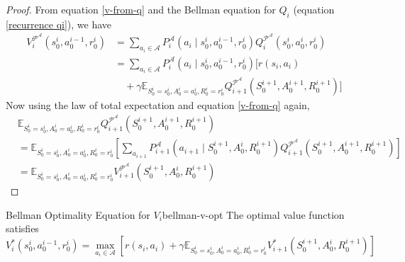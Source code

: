 \documentclass[a4paper, 11pt]{article}
\numberwithin{equation}{section}
\theoremstyle{plain}
\theoremstyle{definition}
\newcommand{\E}{{\mathbb E}}
\newcommand{\1}{{\mathbbm 1}}
\newcommand{\mc}[1]{\mathcal{#1}}
\begin{document}
	\begin{proof}
		From equation \eqref{v-from-q} and the Bellman equation for $Q_i$ (equation \eqref{recurrence qi}), we have
		\begin{equation*}
			\begin{split}
				V_i^{\mc{P}^\mc{A}}(s_0^i, a_0^{i - 1}, r_0^i) &= \sum_{a_i \in \mc{A}} P^{\mc{A}}_i(a_i\;|\; s_0^i, a_0^{i-1}, r_0^i) Q^{\mc{P}^\mc{A}}_i(s_0^i, a_0^{i}, r_0^i)\\
				&= \sum_{a_i \in \mc{A}} P^{\mc{A}}_i(a_i\;|\; s_0^i, a_0^{i-1}, r_0^i) \Big[ r(s_i, a_i) \\
				&\quad + \gamma\E_{S_0^i = s_0^i, A_0^{i} = a_0^{i}, R_0^i = r_0^i} Q_{i + 1}^{\mc{P}^\mc{A}}(S_0^{i+1}, A_0^{i+1}, R_0^{i+1}) \Big]
			\end{split}
		\end{equation*}
		Now using the law of total expectation and equation \eqref{v-from-q} again,
		\begin{equation*}
			\begin{split}
				&\E_{S_0^i = s_0^i, A_0^{i} = a_0^{i}, R_0^i = r_0^i} Q_{i + 1}^{\mc{P}^\mc{A}}(S_0^{i+1}, A_0^{i+1}, R_0^{i+1})\\
				&= \E_{S_0^i = s_0^i, A_0^{i} = a_0^{i}, R_0^i = r_0^i} \left[\sum_{a_{i+1}} P^{\mc{A}}_{i+1}(a_{i+1}\;|\; S_0^{i+1}, A_0^i, R_0^{i+1}) Q_{i+1}^{\mc{P}^\mc{A}}(S_0^{i+1}, A_0^{i+1}, R_0^{i+1})\right]\\
				&= \E_{S_0^i = s_0^i, A_0^{i} = a_0^{i}, R_0^i = r_0^i} V_{i + 1}^{\mc{P}^\mc{A}}(S_0^{i+1}, A_0^{i}, R_0^{i+1})
			\end{split}
		\end{equation*}
	\end{proof}
	
	\begin{fprop}{Bellman Optimality Equation for $V_i$}{bellman-v-opt}
		The optimal value function satisfies
		\begin{equation}\label{v-opt-bellman}
			V_i^{*}(s_0^i, a_0^{i-1}, r_0^i) = \max_{a_i \in \mc{A}} \left[ r(s_i, a_i) + \gamma\E_{S_0^i = s_0^i, A_0^{i} = a_0^{i}, R_0^i = r_0^i} V_{i + 1}^{*}(S_0^{i+1}, A_0^{i}, R_0^{i+1}) \right]
		\end{equation}
	\end{fprop}
	
\end{document}
